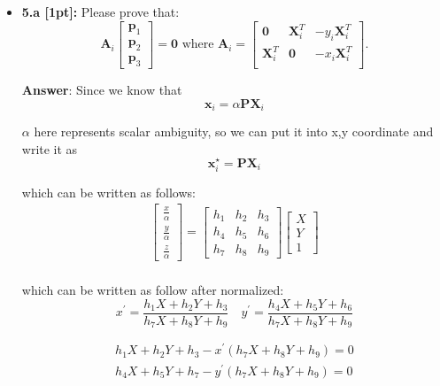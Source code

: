 \documentclass[11pt]{article}
\begin{document}
\begin{itemize}
\item \textbf{5.a [1pt]:} Please prove that:
\[
\mathbf{A}_i 
\left[
\begin{array}{c}
\mathbf{p}_1 \\
\mathbf{p}_2 \\
\mathbf{p}_3
\end{array}
\right] = \mathbf{0} \textrm{\ where \ } \mathbf{A}_i = \left[
\begin{array}{ccc}
\mathbf{0} & \mathbf{X}_i^T & - y_i \mathbf{X}_i^T \\
\mathbf{X}_i^T & \mathbf{0} & - x_i \mathbf{X}_i^T \\
\end{array}
\right].
\]

\textbf{Answer}: Since we know that 
\[
\mathbf{x}_i = \alpha \mathbf{P} \mathbf{X}_i
\]

$\alpha$ here represents scalar ambiguity, so we can put it into x,y coordinate and write it as 
\[
\mathbf{x}_i^{\star} = \mathbf{P} \mathbf{X}_i
\]

which can be written as follows:
\[
\begin{array}{c}
    {\left[\begin{array}{l}
    \frac{x}{\alpha} \\
    \frac{y}{\alpha} \\
    \frac{z}{\alpha}
    \end{array}\right]=\left[\begin{array}{lll}
    h_{1} & h_{2} & h_{3} \\
    h_{4} & h_{5} & h_{6} \\
    h_{7} & h_{8} & h_{9}
    \end{array}\right]\left[\begin{array}{c}
    X \\
    Y \\
    1
    \end{array}\right]} \\
\end{array}
\]

which can be written as follow after normalized:
\[
    x^{\prime}=\frac{h_{1} X+h_{2} Y+h_{3}}{h_{7} X+h_{8} Y+h_{9}} \quad y^{\prime}=\frac{h_{4} X+h_{5} Y+h_{6}}{h_{7} X+h_{8} Y+h_{9}}    
\]

\[
\begin{array}{c}
    h_{1} X+h_{2} Y+h_{3}-x^{\prime}\left(h_{7} X+h_{8} Y+h_{9}\right)=0 \\
    h_{4} X+h_{5} Y+h_{7}-y^{\prime}\left(h_{7} X+h_{8} Y+h_{9}\right)=0
\end{array}
\]


\end{itemize}
\end{document}
